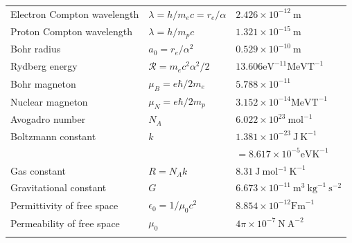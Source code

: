 \documentclass[a4paper,12pt]{article}
\begin{document}
\begin{tabular}{lll}
    Electron Compton wavelength    & $\lambda=h / m_{e} c=r_{e} / \alpha$     & $2.426 \times 10^{-12} \mathrm{~m}$                                            \\
    Proton Compton wavelength      & $\lambda=h / m_{p} c$                    & $1.321 \times 10^{-15} \mathrm{~m}$                                            \\
    Bohr radius                    & $a_{0}=r_{e} / \alpha^{2}$               & $0.529 \times 10^{-10} \mathrm{~m}$                                            \\
    Rydberg energy                 & $\mathcal{R}=m_{e} c^{2} \alpha^{2} / 2$ & $13.606 \mathrm{eV}^{-11} \mathrm{MeV} \mathrm{T}^{-1}$                        \\
    Bohr magneton                  & $\mu_{B}=e \hbar / 2 m_{e}$              & $5.788 \times 10^{-11}$                                                        \\
    Nuclear magneton               & $\mu_{N}=e \hbar / 2 m_{p}$              & $3.152 \times 10^{-14} \mathrm{MeV} \mathrm{T}^{-1}$                           \\
    \hline Avogadro number         & $N_{A}$                                  & $6.022 \times 10^{23} \mathrm{~mol}^{-1}$                                      \\
    Boltzmann constant             & $k$                                      & $1.381 \times 10^{-23} \mathrm{~J} \mathrm{~K}^{-1}$                           \\
                                   &                                          & $=8.617 \times 10^{-5} \mathrm{eV} \mathrm{K}^{-1}$                            \\
    Gas constant                   & $R=N_{A} k$                              & $8.31 \mathrm{~J} \mathrm{~mol}{ }^{-1} \mathrm{~K}^{-1}$                      \\
    Gravitational constant         & $G$                                      & $6.673 \times 10^{-11} \mathrm{~m}^{3} \mathrm{~kg}^{-1} \mathrm{~s}^{-2}$     \\
    Permittivity of free space     & $\epsilon_{0}=1 / \mu_{0} c^{2}$         & $8.854 \times 10^{-12} \mathrm{Fm}^{-1}$                                       \\
    Permeability of free space     & $\mu_{0}$                                & $4 \pi \times 10^{-7} \mathrm{~N} \mathrm{~A}^{-2}$                            \\
    \hline                         &                                          & 
\end{tabular}
\end{document}
